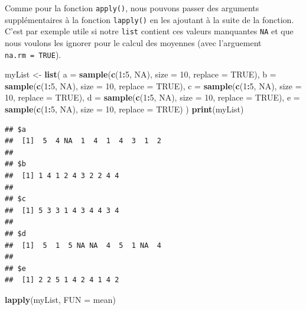 \documentclass[]{book}
\newenvironment{Shaded}{\begin{snugshade}}{\end{snugshade}}
\newcommand{\DataTypeTok}[1]{\textcolor[rgb]{0.13,0.29,0.53}{#1}}
\newcommand{\DecValTok}[1]{\textcolor[rgb]{0.00,0.00,0.81}{#1}}
\newcommand{\KeywordTok}[1]{\textcolor[rgb]{0.13,0.29,0.53}{\textbf{#1}}}
\newcommand{\NormalTok}[1]{#1}
\newcommand{\OperatorTok}[1]{\textcolor[rgb]{0.81,0.36,0.00}{\textbf{#1}}}
\newcommand{\OtherTok}[1]{\textcolor[rgb]{0.56,0.35,0.01}{#1}}
\newcommand{\StringTok}[1]{\textcolor[rgb]{0.31,0.60,0.02}{#1}}
\begin{document}
Comme pour la fonction \texttt{apply()}, nous pouvons passer des arguments supplémentaires à la fonction \texttt{lapply()} en les ajoutant à la suite de la fonction. C'est par exemple utile si notre \texttt{list} contient ces valeurs manquantes \texttt{NA} et que nous voulons les ignorer pour le calcul des moyennes (avec l'arguement \texttt{na.rm\ =\ TRUE}).

\begin{Shaded}
\begin{Highlighting}[]
\NormalTok{myList <-}\StringTok{ }\KeywordTok{list}\NormalTok{(}
  \DataTypeTok{a =} \KeywordTok{sample}\NormalTok{(}\KeywordTok{c}\NormalTok{(}\DecValTok{1}\OperatorTok{:}\DecValTok{5}\NormalTok{, }\OtherTok{NA}\NormalTok{), }\DataTypeTok{size =} \DecValTok{10}\NormalTok{, }\DataTypeTok{replace =} \OtherTok{TRUE}\NormalTok{), }
  \DataTypeTok{b =} \KeywordTok{sample}\NormalTok{(}\KeywordTok{c}\NormalTok{(}\DecValTok{1}\OperatorTok{:}\DecValTok{5}\NormalTok{, }\OtherTok{NA}\NormalTok{), }\DataTypeTok{size =} \DecValTok{10}\NormalTok{, }\DataTypeTok{replace =} \OtherTok{TRUE}\NormalTok{), }
  \DataTypeTok{c =} \KeywordTok{sample}\NormalTok{(}\KeywordTok{c}\NormalTok{(}\DecValTok{1}\OperatorTok{:}\DecValTok{5}\NormalTok{, }\OtherTok{NA}\NormalTok{), }\DataTypeTok{size =} \DecValTok{10}\NormalTok{, }\DataTypeTok{replace =} \OtherTok{TRUE}\NormalTok{), }
  \DataTypeTok{d =} \KeywordTok{sample}\NormalTok{(}\KeywordTok{c}\NormalTok{(}\DecValTok{1}\OperatorTok{:}\DecValTok{5}\NormalTok{, }\OtherTok{NA}\NormalTok{), }\DataTypeTok{size =} \DecValTok{10}\NormalTok{, }\DataTypeTok{replace =} \OtherTok{TRUE}\NormalTok{), }
  \DataTypeTok{e =} \KeywordTok{sample}\NormalTok{(}\KeywordTok{c}\NormalTok{(}\DecValTok{1}\OperatorTok{:}\DecValTok{5}\NormalTok{, }\OtherTok{NA}\NormalTok{), }\DataTypeTok{size =} \DecValTok{10}\NormalTok{, }\DataTypeTok{replace =} \OtherTok{TRUE}\NormalTok{)}
\NormalTok{)}
\KeywordTok{print}\NormalTok{(myList)}
\end{Highlighting}
\end{Shaded}

\begin{verbatim}
## $a
##  [1]  5  4 NA  1  4  1  4  3  1  2
## 
## $b
##  [1] 1 4 1 2 4 3 2 2 4 4
## 
## $c
##  [1] 5 3 3 1 4 3 4 4 3 4
## 
## $d
##  [1]  5  1  5 NA NA  4  5  1 NA  4
## 
## $e
##  [1] 2 2 5 1 4 2 4 1 4 2
\end{verbatim}

\begin{Shaded}
\begin{Highlighting}[]
\KeywordTok{lapply}\NormalTok{(myList, }\DataTypeTok{FUN =}\NormalTok{ mean)}
\end{Highlighting}
\end{Shaded}
\end{document}
